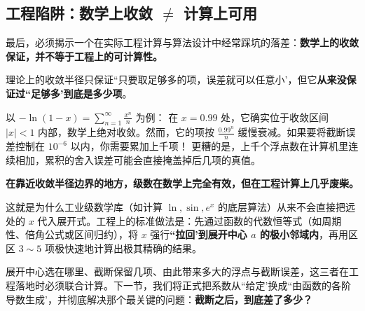 \subsection{工程陷阱：数学上收敛 \(\neq\) 计算上可用}

最后，必须揭示一个在实际工程计算与算法设计中经常踩坑的落差：\textbf{数学上的收敛保证，并不等于工程上的可计算性。}

理论上的收敛半径只保证``只要取足够多的项，误差就可以任意小'，但它\textbf{从来没保证过``足够多'到底是多少项}。

以 \(-\ln(1-x) = \sum_{n=1}^{\infty} \frac{x^n}{n}\) 为例：
在 \(x = 0.99\) 处，它确实位于收敛区间 \(|x| < 1\) 内部，数学上绝对收敛。然而，它的项按 \(\frac{0.99^n}{n}\) 缓慢衰减。如果要将截断误差控制在 \(10^{-6}\) 以内，你需要累加上千项！
更糟的是，上千个浮点数在计算机里连续相加，累积的舍入误差可能会直接掩盖掉后几项的真值。

\textbf{在靠近收敛半径边界的地方，级数在数学上完全有效，但在工程计算上几乎废柴。}

这就是为什么工业级数学库（如计算 \(\ln, \sin, e^x\) 的底层算法）从来不会直接把远处的 \(x\) 代入展开式。工程上的标准做法是：先通过函数的代数恒等式（如周期性、倍角公式或区间归约），将 \(x\) 强行\textbf{``拉回'到展开中心 \(a\) 的极小邻域内}，再用区区 \(3 \sim 5\) 项极快速地计算出极其精确的结果。

展开中心选在哪里、截断保留几项、由此带来多大的浮点与截断误差，这三者在工程落地时必须联合计算。下一节，我们将正式把系数从``给定'换成``由函数的各阶导数生成'，并彻底解决那个最关键的问题：\textbf{截断之后，到底差了多少？}
